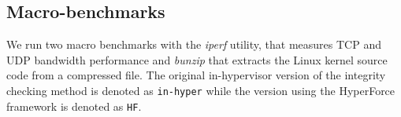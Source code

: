 %

\subsection{Macro-benchmarks} \label{macrobench}
We run two macro benchmarks with the \emph{iperf} utility, that measures TCP and UDP bandwidth performance and \emph{bunzip} that extracts the Linux kernel source code from a compressed file. The original in-hypervisor version of the integrity checking method is denoted as \texttt{in-hyper} while the version using the HyperForce framework is denoted as \texttt{HF}.

